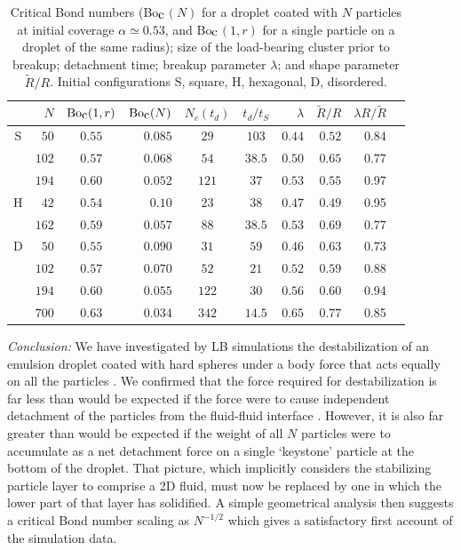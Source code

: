 \documentclass[aps,prl,superscriptaddress,twocolumn,showpacs,floatfix]{revtex4-1}
\newcommand{\Bocm}{Bo$_{\hbox{\rm c}}$}
\begin{document}
\begin{table}
\begin{center}
\begin{tabular}{c  r c r c c r r r r}
\hline
 & $N$ & ${\rm Bo}_{\hbox{\rm c}}(1,r)$ & ${\rm Bo}_{\hbox{\rm c}}(N)$ & $N_{c}(t_d)$ & $t_{d}/t_S$ & $\lambda$ & $\tilde R/R$ & $\lambda R/\tilde R$\\ \hline
S & $50$ & $0.55$ & $0.085$ & $29$ & $103$ & $0.44$  & $0.52$ & 0.84\\
        & $102$& $0.57$ & $0.068$ & $54$ & $38.5$ & $0.50$  & $0.65$ & 0.77\\
        & $194$& $0.60$ & $0.052$ & $121$ & $37$& $0.53$  & $0.55$ & 0.97\\ \hline
H & $42$ & $0.54$ & $0.10$ & $23$ & $38$ & $0.47$  & $0.49$ & 0.95\\
& $162$& $0.59$ & $0.057$ & $88$ & $38.5$ & $0.53$  & $0.69$ & 0.77\\ \hline
D& $50$ & $0.55$ & $0.090$ & $31$ & $59$ & $0.46$ &  $0.63$ & 0.73\\
        & $102$& $0.57$ & $0.070$ & $52$ & $21$ &  $0.52$  & $0.59$ & 0.88\\
        & $194$& $0.60$ & $0.055$ & $122$ & $30$& $0.56$  & $0.60$ & 0.94\\ 
        & $700$& $0.63$ & $0.034$ & $342$ & $14.5$& $0.65$  & $0.77$ & 0.85\\ \hline
\end{tabular}
\caption[smallcaption]{Critical Bond numbers (\Bocm $(N)$ for a droplet coated with $N$ particles at initial coverage $\alpha \simeq 0.53$, and \Bocm $(1,r)$ for a single particle on a droplet of the same radius); size of the load-bearing cluster prior to breakup; detachment time; breakup parameter $\lambda$; and shape parameter $\tilde R/R$. Initial configurations S, square, H, hexagonal, D, disordered. }
\label{table:criticalBo}
\end{center}
\end{table}

\textit{Conclusion:}
We have investigated by LB simulations the destabilization of an emulsion droplet coated with hard spheres under a body force that acts equally on all the particles
\cite{fuller:2005/a,aubry:2010/a,Joe}. We confirmed that the force required for destabilization is far less than would be expected if the force were to cause independent detachment of the particles from the fluid-fluid interface \cite{kim:one}. However, it is also far greater than would be expected if the weight of all $N$ particles were to accumulate as a net detachment force on a single `keystone' particle at the bottom of the droplet. That picture, which implicitly considers the stabilizing particle layer to comprise a 2D fluid, must now be replaced by one in which the lower part of that layer has solidified. A simple geometrical analysis then suggests a critical Bond number scaling as $N^{-1/2}$ which gives a satisfactory first account of the simulation data.
\end{document}
